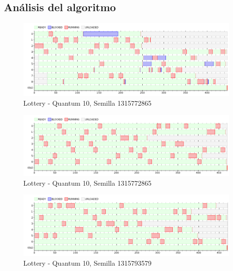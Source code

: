 \subsection{An\'alisis del algoritmo}
\begin{figure}[H]
\centering
\includegraphics[scale=0.5]{./graficos/out_ej_8.png}
\caption{Lottery - Quantum 10, Semilla 1315772865}
\end{figure} 

\begin{figure}[H]
\centering
\includegraphics[scale=0.5]{./graficos/out_ej_8_2.png}
\caption{Lottery - Quantum 10, Semilla 1315772865}
\end{figure} 

\begin{figure}[H]
\centering
\includegraphics[scale=0.5]{./graficos/out_ej_8_3.png}
\caption{Lottery - Quantum 10, Semilla 1315793579}
\end{figure} 

